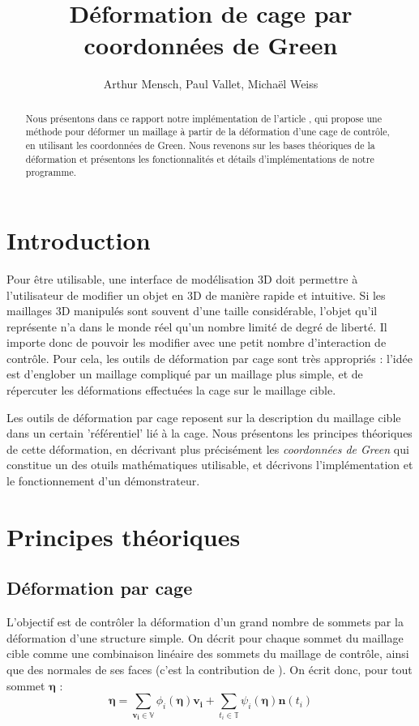 \documentclass[10pt,a4paper]{article}
\author{Arthur Mensch, Paul Vallet, Michaël Weiss}
\title{Déformation de cage par coordonnées de Green}
\begin{document}
\maketitle
\begin{abstract}
Nous présentons dans ce rapport notre implémentation de l'article \cite{lipman2008green}, qui propose une méthode pour déformer un maillage à partir de la déformation d'une cage de contrôle, en utilisant les coordonnées de Green. Nous revenons sur les bases théoriques de la déformation et présentons les fonctionnalités et détails d'implémentations de notre programme.
\end{abstract}
\section*{Introduction}

Pour être utilisable, une interface de modélisation 3D doit permettre à l'utilisateur de modifier un objet en 3D de manière rapide et intuitive. Si les maillages 3D manipulés sont souvent d'une taille considérable, l'objet qu'il représente n'a dans le monde réel qu'un nombre limité de degré de liberté. Il importe donc de pouvoir les modifier avec une petit nombre d'interaction de contrôle. Pour cela, les outils de déformation par cage sont très appropriés : l'idée est d'englober un maillage compliqué par un maillage plus simple, et de répercuter les déformations effectuées la cage sur le maillage cible. 

Les outils de déformation par cage reposent sur la description du maillage cible dans un certain 'référentiel' lié à la cage. Nous présentons les principes théoriques de cette déformation, en décrivant plus précisément les \textit{coordonnées de Green} qui constitue un des otuils mathématiques utilisable, et décrivons l'implémentation et le fonctionnement d'un démonstrateur. 

\section{Principes théoriques}
\label{section:theory}

\subsection{Déformation par cage}

L'objectif est de contrôler la déformation d'un grand nombre de sommets par la déformation d'une structure simple. On décrit pour chaque sommet du maillage cible comme une combinaison linéaire des sommets du maillage de contrôle, ainsi que des normales de ses faces (c'est la contribution de \cite{lipman2008green}). On écrit donc, pour tout sommet $\mathbf{\eta}$ :
\begin{equation}
\label{eq:linear}
\mathbf{\eta} = \sum_{\mathbf{v_i} \in \mathbb{V}} \phi_i \left( \mathbf{\eta} \right) \mathbf{v_i} 
+ \sum_{t_i \in \mathbb{T}} \psi_i \left( \mathbf{\eta} \right) \mathbf{n} \left( t_i \right)
\end{equation}
\end{document}

